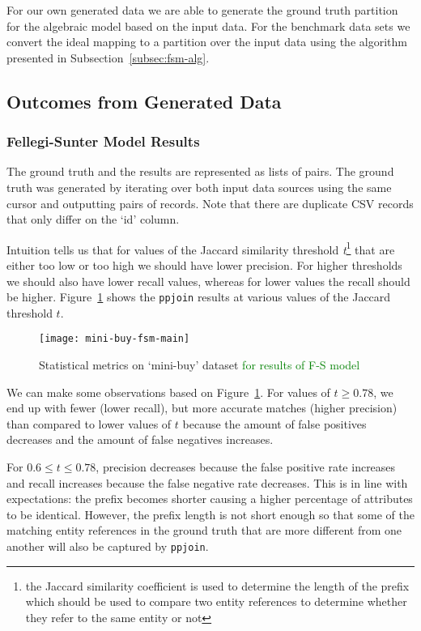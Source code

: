 For our own generated data we are able to generate the ground truth partition
for the algebraic model based on the input data.
For the benchmark data sets we convert the ideal mapping to a partition over the
input data using the algorithm presented in Subsection~\ref{subsec:fsm-alg}.

\subsection{Outcomes from Generated Data}\label{subsec:experiment-mini-buy}

\subsubsection{Fellegi-Sunter Model Results}

The ground truth and the results are represented as lists of pairs.
The ground truth was generated by iterating over both input data sources using
the same cursor and outputting pairs of records.
Note that there are duplicate CSV records that only differ on the `id' column.

Intuition tells us that for values of the Jaccard similarity threshold
\textit{t}\footnote[1]{the Jaccard similarity coefficient is used to determine
the length of the prefix which should be used to compare two entity references
to determine whether they refer to the same entity or not} that are either too
low or too high we should have lower precision.
For higher thresholds we should also have lower recall values, whereas for
lower values the recall should be higher.
Figure~\ref{fig:mini-buy-fs} shows the \texttt{ppjoin} results at various
values of the Jaccard threshold $t$.

\begin{figure}[!hp]
    \centering
    \captionsetup{justification=centering}
    \texttt{[image: mini-buy-fsm-main]}
    \caption{Statistical metrics on `mini-buy' dataset
    \textcolor{green}{for results of F-S model}
    }
    \label{fig:mini-buy-fs}
\end{figure}

We can make some observations based on Figure~\ref{fig:mini-buy-fs}.
For values of $t \geq 0.78$, we end up with fewer (lower recall), but more
accurate matches (higher precision) than compared to lower values of $t$ because
the amount of false positives decreases and the amount of false negatives
increases.

For $0.6 \leq t \le 0.78$, precision decreases because the false
positive rate increases and recall increases because the false negative rate
decreases.
This is in line with expectations: the prefix becomes shorter causing a higher
percentage of attributes to be identical.
However, the prefix length is not short enough so that some of the matching
entity references in the ground truth that are more different from one another
will also be captured by \texttt{ppjoin}.

